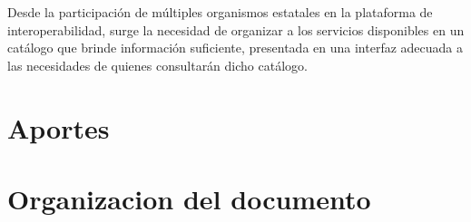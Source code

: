 Desde la participación de múltiples organismos estatales en la plataforma de interoperabilidad, surge la necesidad de organizar a los servicios disponibles en un catálogo que brinde información suficiente, presentada en una interfaz adecuada a las necesidades de quienes consultarán dicho catálogo.

\section{Aportes}
\label{capitulo1:Aportes}

\section{Organizacion del documento}
\label{capitulo1:Organizacion_del_documento}